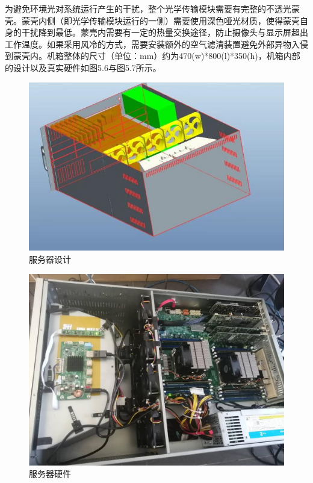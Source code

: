 为避免环境光对系统运行产生的干扰，整个光学传输模块需要有完整的不透光蒙壳。蒙壳内侧（即光学传输模块运行的一侧）需要使用深色哑光材质，使得蒙壳自身的干扰降到最低。蒙壳内需要有一定的热量交换途径，防止摄像头与显示屏超出工作温度。如果采用风冷的方式，需要安装额外的空气滤清装置避免外部异物入侵到蒙壳内。机箱整体的尺寸（单位：mm）约为470(w)*800(l)*350(h)，机箱内部的设计以及真实硬件如图5.6与图5.7所示。

\begin{figure}[!htbp]
\centering
\includegraphics[scale=1.6]{figures/HW/Design.png}
\caption{服务器设计}
\end{figure}

\begin{figure}[!htbp]
\centering
\includegraphics[scale=1]{figures/HW/Real_HW.png}
\caption{服务器硬件}
\end{figure}

